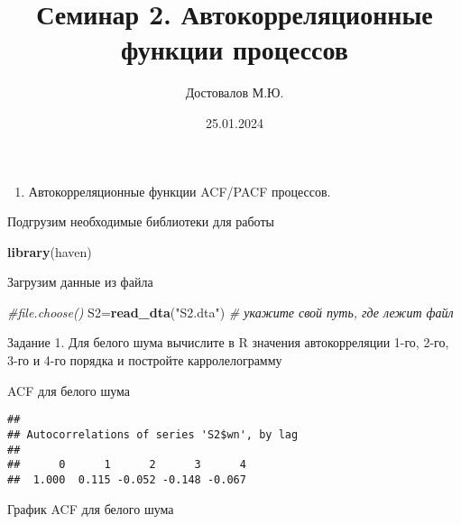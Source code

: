\documentclass[
]{article}
\title{Семинар 2. Автокорреляционные функции процессов}
\author{Достовалов М.Ю.}
\date{25.01.2024}
\newenvironment{Shaded}{\begin{snugshade}}{\end{snugshade}}
\newcommand{\AttributeTok}[1]{\textcolor[rgb]{0.13,0.29,0.53}{#1}}
\newcommand{\CommentTok}[1]{\textcolor[rgb]{0.56,0.35,0.01}{\textit{#1}}}
\newcommand{\ConstantTok}[1]{\textcolor[rgb]{0.56,0.35,0.01}{#1}}
\newcommand{\DecValTok}[1]{\textcolor[rgb]{0.00,0.00,0.81}{#1}}
\newcommand{\FunctionTok}[1]{\textcolor[rgb]{0.13,0.29,0.53}{\textbf{#1}}}
\newcommand{\NormalTok}[1]{#1}
\newcommand{\OtherTok}[1]{\textcolor[rgb]{0.56,0.35,0.01}{#1}}
\newcommand{\SpecialCharTok}[1]{\textcolor[rgb]{0.81,0.36,0.00}{\textbf{#1}}}
\newcommand{\StringTok}[1]{\textcolor[rgb]{0.31,0.60,0.02}{#1}}
\providecommand{\tightlist}{%
  \setlength{\itemsep}{0pt}\setlength{\parskip}{0pt}}
\begin{document}
\maketitle

\begin{enumerate}
\def\labelenumi{\arabic{enumi}.}
\setcounter{enumi}{1}
\tightlist
\item
  Автокорреляционные функции ACF/PACF процессов.
\end{enumerate}

Подгрузим необходимые библиотеки для работы

\begin{Shaded}
\begin{Highlighting}[]
\FunctionTok{library}\NormalTok{(haven)}
\end{Highlighting}
\end{Shaded}

Загрузим данные из файла

\begin{Shaded}
\begin{Highlighting}[]
\CommentTok{\#file.choose()}
\NormalTok{S2}\OtherTok{=}\FunctionTok{read\_dta}\NormalTok{(}\StringTok{"S2.dta"}\NormalTok{) }\CommentTok{\# укажите свой путь, где лежит файл}
\end{Highlighting}
\end{Shaded}

Задание 1. Для белого шума вычислите в R значения автокорреляции 1-го,
2-го, 3-го и 4-го порядка и постройте карролелограмму

ACF для белого шума

\begin{Shaded}
\end{Shaded}

\begin{verbatim}
## 
## Autocorrelations of series 'S2$wn', by lag
## 
##      0      1      2      3      4 
##  1.000  0.115 -0.052 -0.148 -0.067
\end{verbatim}

График ACF для белого шума

\begin{Shaded}
\end{Shaded}
\end{document}
